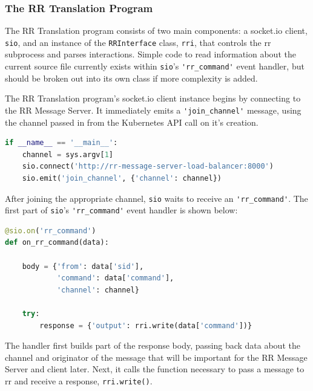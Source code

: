 \documentclass[12pt]{article}
\begin{document}
\subsubsection{The RR Translation Program} \label{joiningchannel}

The RR Translation program consists of two main components: a socket.io
client, \lstinline{sio}, and an instance of the
\lstinline{RRInterface} class, \lstinline{rri}, that controls the rr
subprocess and parses interactions.  Simple code to read information
about the current source file currently exists within
\lstinline{sio}'s \lstinline{'rr_command'} event handler, but should
be broken out into its own class if more complexity is added.
\par

The RR Translation program's socket.io client instance begins by
connecting to the RR Message Server.  It immediately emits a
\lstinline{'join_channel'} message, using the channel passed in from
the Kubernetes API call on it's creation. 

\begin{lstlisting}[language=Python,basicstyle=\linespread{0.5}\ttfamily,caption={RR Translation Main},captionpos=b]
if __name__ == '__main__':
    channel = sys.argv[1]
    sio.connect('http://rr-message-server-load-balancer:8000')
    sio.emit('join_channel', {'channel': channel})
\end{lstlisting}

After joining the appropriate channel, \lstinline{sio} waits to
receive an \lstinline{'rr_command'}.  The first part of
\lstinline{sio}'s \lstinline{'rr_command'} event handler is shown below:

\begin{lstlisting}[language=Python,basicstyle=\linespread{0.5}\ttfamily,caption={RR Command Event Handler},captionpos=b]
@sio.on('rr_command')
def on_rr_command(data):

    body = {'from': data['sid'],
            'command': data['command'],
            'channel': channel}
    
    try:
        response = {'output': rri.write(data['command'])}
\end{lstlisting}

The handler first builds part of the response body, passing back data
about the channel and originator of the message that will be important
for the RR Message Server and client later.  Next, it calls the
function necessary to pass a message to rr and receive a response,
\lstinline{rri.write()}.
\par
\end{document}
